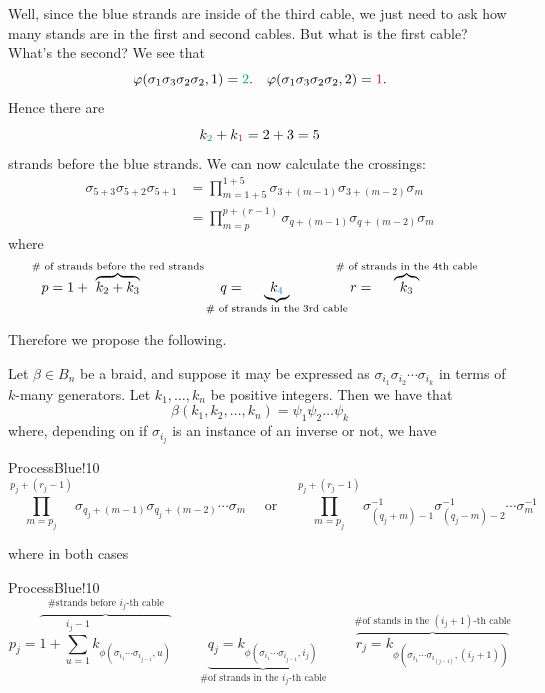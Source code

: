 Well, since the blue strands are inside of the third cable, we just need to ask how many 
stands are in the first and second cables. But what is the first cable? What's the second?
We see that
\[
    \phi(\sigma_1\sigma_3\sigma_2\sigma_2, 1) =  \textcolor{Green}{2}.
    \quad 
    \phi(\sigma_1\sigma_3\sigma_2\sigma_2, 2) = \textcolor{Red}{1}.
\]
Hence there are 
\[
    k_{\textcolor{Green}{2}} + k_{\textcolor{Red}{1}} = 2 + 3 = 5    
\]
strands before the blue strands. We can now calculate the crossings: 
\begin{align*}
    \sigma_{5 + 3}\sigma_{5 + 2} \sigma_{5 + 1}
    &=
    \prod_{m = 1 + 5}^{1 + 5}\sigma_{3 + (m - 1)}\sigma_{3 + (m - 2)}\sigma_m\\
    &=
    \prod_{m = p}^{p + (r - 1)}\sigma_{q + (m - 1)}\sigma_{q + (m - 2)}\sigma_m
\end{align*}
where 
\[
    p = 1 + \hspace{-1.5cm}\overbrace{k_2 + k_3}^{\text{\# of strands before the red strands}}
    \quad 
    q = \hspace{-1cm}\underbrace{k_{\textcolor{RoyalBlue}{4}}}_{\text{\# of strands in the 3rd cable}}
    r = \hspace{-1cm}\overbrace{k_{\textcolor{Black}{3}}}^{\text{\# of strands in the 4th cable}}
\]


Therefore we propose the following. 
\begin{lemma}
    Let $\beta \in B_n$ be a braid, and suppose it 
    may be expressed as $\sigma_{i_1}\sigma_{i_2} \cdots \sigma_{i_k}$ in terms of $k$-many 
    generators. Let $k_1, \dots, k_n$ be positive integers. Then we have that 
    \[
        \beta(k_1, k_2, \dots, k_n) 
        = 
        \psi_1\psi_2\dots\psi_k
    \]  
    where, depending on if $\sigma_{i_j}$ is an instance of an inverse or not, 
    we have 
    \begin{statement}{ProcessBlue!10}
    \[
        \prod_{m = p_j}^{p_j + (r_j-1)}
        \sigma_{q_j + (m-1)}
        \sigma_{q_j + (m-2)}
        \cdots 
        \sigma_{m}
        \quad 
        \text{ or }
        \quad 
        \prod_{m = p_j}^{p_j + (r_j-1)}
        \sigma^{-1}_{(q_j + m) - 1}
        \sigma^{-1}_{(q_j -m) - 2}
        \cdots 
        \sigma^{-1}_{m}
    \]
    \end{statement}
    where in both cases
    \begin{statement}{ProcessBlue!10}
    \[
        p_j
        =
        \overbrace{
        1 +
        \sum_{u = 1}^{i_j-1}
        k_{\phi(\sigma_{i_1}\cdots\sigma_{i_{j-1}}, u)}
        }^{\text{\# strands before } i_j\text{-th cable} }
        \qquad
        \underbrace{
        q_j = 
        k_{\phi(\sigma_{i_1}\cdots\sigma_{i_{j-1}}, i_j)}
        }_{\text{\# of strands in the }i_j \text{-th cable}}
        \qquad 
        \overbrace{
        r_j
        =
        k_{\phi(\sigma_{i_1}\cdots\sigma_{i_{(j-1)}}, (i_j+1))}
        }^{\text{\# of stands in the } (i_j+1)\text{-th cable} }
    \]
    \end{statement}
\end{lemma}

